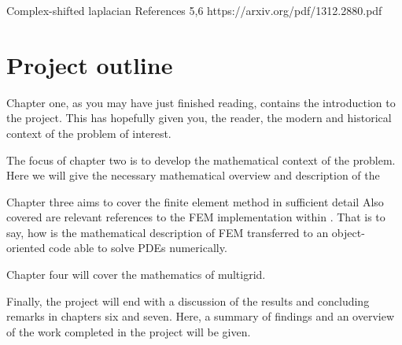 Complex-shifted laplacian 
References 5,6
https://arxiv.org/pdf/1312.2880.pdf







\section{Project outline}

\iffalse
What is each chapter doing? What do we hope to accomplish? 
This entire chapter will need fleshing out/rewording depending on the scope of each chapter.
\fi

Chapter one, as you may have just finished reading, contains the introduction to the project.
This has hopefully given you, the reader, the modern and historical context of the problem of interest.

The focus of chapter two is to develop the mathematical context of the problem.
Here we will give the necessary mathematical overview and description of the 

Chapter three aims to cover the finite element method in sufficient detail 
Also covered are relevant references to the FEM implementation within \oomph.
That is to say, how is the mathematical description of FEM transferred to an object-oriented code able to solve PDEs numerically.

Chapter four will cover the mathematics of multigrid.

Finally, the project will end with a discussion of the results and concluding remarks in chapters six and seven.
Here, a summary of findings and an overview of the work completed in the project will be given.
